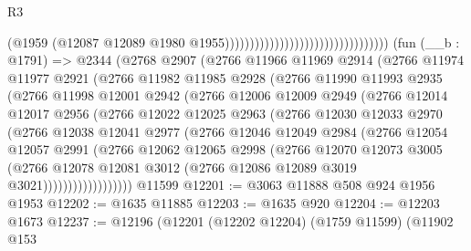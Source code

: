 \begin{lexlean}{R3}
\begin{coremodule}
                                                                  (@1959
                                                                    (@12087
                                                                      @12089
                                                                      @1980
                                                                      @1955)))))))))))))))))))))))))))))))))
    (fun (__b : @1791) =>
    @2344
      (@2768
        @2907
        (@2766
          @11966
          @11969
          @2914
          (@2766
            @11974
            @11977
            @2921
            (@2766
              @11982
              @11985
              @2928
              (@2766
                @11990
                @11993
                @2935
                (@2766
                  @11998
                  @12001
                  @2942
                  (@2766
                    @12006
                    @12009
                    @2949
                    (@2766
                      @12014
                      @12017
                      @2956
                      (@2766
                        @12022
                        @12025
                        @2963
                        (@2766
                          @12030
                          @12033
                          @2970
                          (@2766
                            @12038
                            @12041
                            @2977
                            (@2766
                              @12046
                              @12049
                              @2984
                              (@2766
                                @12054
                                @12057
                                @2991
                                (@2766
                                  @12062
                                  @12065
                                  @2998
                                  (@2766
                                    @12070
                                    @12073
                                    @3005
                                    (@2766
                                      @12078
                                      @12081
                                      @3012
                                      (@2766 @12086 @12089 @3019 @3021))))))))))))))))))
    @11599
@12201 := @3063 @11888 @508 @924 @1956 @1953
@12202 := @1635 @11885
@12203 := @1635 @920
@12204 := @12203 @1673
@12237 := @12196
    (@12201
      (@12202 @12204)
      (@1759 @11599)
      (@11902
        @153

\end{coremodule}
\end{lexlean}
